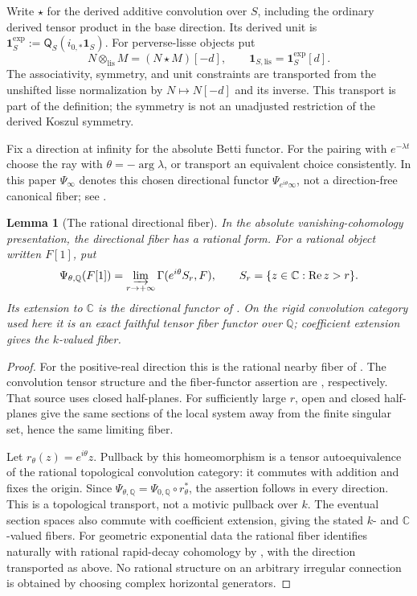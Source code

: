 \documentclass[11pt]{article}
\numberwithin{equation}{section}
\newtheorem{lemma}[lemma]{Lemma}
\theoremstyle{definition}
\theoremstyle{remark}
\newcommand{\Q}{\mathbb Q}
\newcommand{\C}{\mathbb C}
\newcommand{\lis}{\mathrm{lis}}
\newcommand{\one}{\mathbf1}
\begin{document}
Write $\star$ for the derived additive convolution over $S$, including the
ordinary derived tensor product in the base direction. Its derived unit is
$\one_S^{\exp}:=\mathsf Q_S(i_{0,*}\one_S)$. For perverse-lisse objects put
\begin{equation}\label{eq:lisse-tensor}
  N\otimes_{\lis}M=(N\star M)[-d],\qquad
  \one_{S,\lis}=\one_S^{\exp}[d].
\end{equation}
The associativity, symmetry, and unit constraints are transported from the
unshifted lisse normalization by $N\mapsto N[-d]$ and its inverse.
This transport is part of the definition; the symmetry is not an
unadjusted restriction of the derived Koszul symmetry.

Fix a direction at infinity for the absolute Betti functor. For the
pairing with $e^{-\lambda t}$ choose the ray with
$\theta=-\arg\lambda$, or transport an equivalent choice consistently.
In this paper $\Psi_\infty$ denotes this chosen directional functor
$\Psi_{e^{i\theta}\infty}$, not a direction-free canonical fiber; see
\cite[Definition~3.5 and Theorem~3.6]{Snodgrass}.


\begin{lemma}[The rational directional fiber]\label{lem:rational-directional-fiber}
In the absolute vanishing-cohomology presentation, the directional fiber
has a rational form. For a rational object written $F[1]$, put
\[
 \Psi_{\theta,\Q}(F[1])
   =\varinjlim_{r\to+\infty}\Gamma(e^{i\theta}S_r,F),
 \qquad S_r=\{z\in\C:\operatorname{Re}z>r\}.
\]
Its extension to $\C$ is the directional functor of
\cite[Definition~3.5 and Theorem~3.6]{Snodgrass}. On the rigid
convolution category used here it is an exact faithful tensor fiber
functor over $\Q$; coefficient extension gives the $k$-valued fiber.
\end{lemma}
\begin{proof}
For the positive-real direction this is the rational nearby fiber of
\cite[Definition~2.3.5 and Proposition~2.3.7]{FresanJossenExp}.
The convolution tensor structure and the fiber-functor assertion are
\cite[Theorems~2.4.11 and~2.8.1]{FresanJossenExp}, respectively.
That source uses closed half-planes. For sufficiently large $r$, open
and closed half-planes give the same sections of the local system away
from the finite singular set, hence the same limiting fiber.

Let $r_\theta(z)=e^{i\theta}z$. Pullback by this homeomorphism is a
tensor autoequivalence of the rational topological convolution category:
it commutes with addition and fixes the origin. Since
$\Psi_{\theta,\Q}=\Psi_{0,\Q}\circ r_\theta^*$, the assertion follows
in every direction. This is a topological transport, not a motivic
pullback over $k$. The eventual section spaces also commute with
coefficient extension, giving the stated $k$- and $\C$-valued fibers.
For geometric exponential data the rational fiber identifies naturally
with rational rapid-decay cohomology by
\cite[Corollary~3.2.3]{FresanJossenExp}, with the direction transported
as above. No rational structure on an arbitrary irregular connection
is obtained by choosing complex horizontal generators.
\end{proof}
\end{document}
